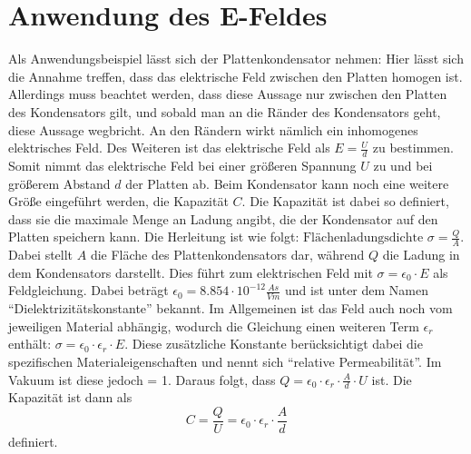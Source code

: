\section{Anwendung des E-Feldes}
\label{sec:Plattenkondensator}
Als Anwendungsbeispiel lässt sich der Plattenkondensator nehmen:
Hier lässt sich die Annahme treffen, dass das elektrische Feld zwischen den Platten homogen ist.
Allerdings muss beachtet werden, dass diese Aussage nur zwischen den Platten des Kondensators gilt, und sobald man an die Ränder des Kondensators geht, diese Aussage wegbricht.
An den Rändern wirkt nämlich ein inhomogenes elektrisches Feld.
Des Weiteren ist das elektrische Feld als $E = \frac{U}{d}$ zu bestimmen.
Somit nimmt das elektrische Feld bei einer größeren Spannung $U$ zu und bei größerem Abstand $d$ der Platten ab.
Beim Kondensator kann noch eine weitere Größe eingeführt werden, die Kapazität $C$.
Die Kapazität ist dabei so definiert, dass sie die maximale Menge an Ladung angibt, die der Kondensator auf den Platten speichern kann.
Die Herleitung ist wie folgt:
$\mbox{Flächenladungsdichte } \sigma = \frac{Q}{A}$.
Dabei stellt $A$ die Fläche des Plattenkondensators dar, während $Q$ die Ladung in dem Kondensators darstellt.
Dies führt zum elektrischen Feld mit $\sigma = \epsilon_0 \cdot E$ als Feldgleichung.
Dabei beträgt $\epsilon_0 = 8.854 \cdot 10^{-12} \frac{As}{Vm}$ und ist unter dem Namen "`Dielektrizitätskonstante"' bekannt.
Im Allgemeinen ist das Feld auch noch vom jeweiligen Material abhängig, wodurch die Gleichung einen weiteren Term $\epsilon_r$ enthält: $\sigma = \epsilon_0 \cdot \epsilon_r \cdot E$.
Diese zusätzliche Konstante berücksichtigt dabei die spezifischen Materialeigenschaften und nennt sich "`relative Permeabilität"'.
Im Vakuum ist diese jedoch = 1.
Daraus folgt, dass $ Q = \epsilon_0 \cdot \epsilon_r \cdot \frac{A}{d} \cdot U$ ist.
Die Kapazität ist dann als
\begin{equation*}
    C = \frac{Q}{U} = \epsilon_0 \cdot \epsilon_r \cdot \frac{A}{d}
\end{equation*}
definiert.
